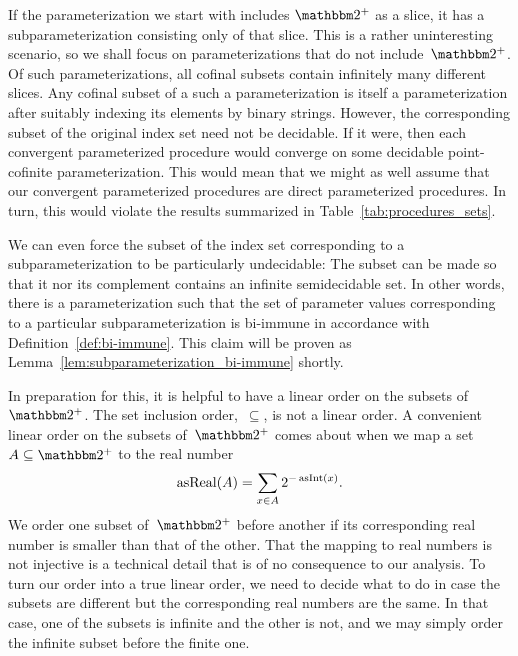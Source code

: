 If the parameterization we start with includes $\binary^+$ as a slice, it has a subparameterization consisting only of that slice.
This is a rather uninteresting scenario, so we shall focus on parameterizations that do not include~$\binary^+$.
Of such parameterizations, all cofinal subsets contain infinitely many different slices.
Any cofinal subset of a such a parameterization is itself a parameterization after suitably indexing its elements by binary strings.
However, the corresponding subset of the original index set need not be decidable.
If it were, then each convergent parameterized procedure would converge on some decidable point-cofinite parameterization.
This would mean that we might as well assume that our convergent parameterized procedures are direct parameterized procedures.
In turn, this would violate the results summarized in Table~\ref{tab:procedures_sets}.

We can even force the subset of the index set corresponding to a subparameterization to be particularly undecidable:
The subset can be made so that it nor its complement contains an infinite semidecidable set.
In other words, there is a parameterization such that the set of parameter values corresponding to a particular subparameterization is bi-immune in accordance with Definition~\ref{def:bi-immune}.
This claim will be proven as Lemma~\ref{lem:subparameterization_bi-immune} shortly.

In preparation for this, it is helpful to have a linear order on the subsets of~$\binary^+$.
The set inclusion order,~$\subseteq$, is not a linear order.
A convenient linear order on the subsets of~$\binary^+$ comes about when we map a set $A \subseteq \binary^+$ to the real number
\begin{equation*}
  \operatorname{asReal}(A) = \sum_{x \in A} 2^{-\operatorname{asInt}(x)}.
\end{equation*}
We order one subset of~$\binary^+$ before another if its corresponding real number is smaller than that of the other.
That the mapping to real numbers is not injective is a technical detail that is of no consequence to our analysis.
To turn our order into a true linear order, we need to decide what to do in case the subsets are different but the corresponding real numbers are the same.
In that case, one of the subsets is infinite and the other is not, and we may simply order the infinite subset before the finite one.

